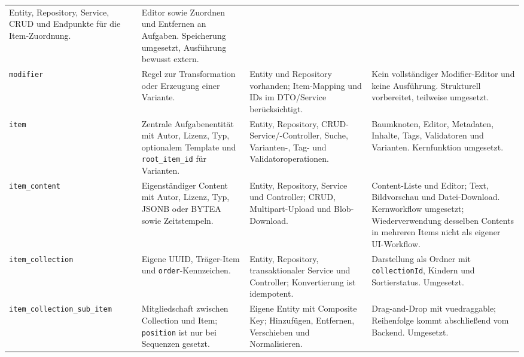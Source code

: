 \documentclass[11pt,a4paper]{article}
\begin{document}
\begin{longtable}{|p{.13\linewidth}|p{.24\linewidth}|p{.28\linewidth}|p{.24\linewidth}|}
Entity, Repository, Service, CRUD und Endpunkte für die Item-Zuordnung.&
Editor sowie Zuordnen und Entfernen an Aufgaben. Speicherung umgesetzt,
Ausführung bewusst extern.\\
\texttt{modifier}&Regel zur Transformation oder Erzeugung einer Variante.&
Entity und Repository vorhanden; Item-Mapping und IDs im DTO/Service
berücksichtigt.&Kein vollständiger Modifier-Editor und keine Ausführung.
Strukturell vorbereitet, teilweise umgesetzt.\\
\texttt{item}&Zentrale Aufgabenentität mit Autor, Lizenz, Typ, optionalem
Template und \texttt{root\_item\_id} für Varianten.&Entity, Repository,
CRUD-Service/-Controller, Suche, Varianten-, Tag- und Validatoroperationen.&
Baumknoten, Editor, Metadaten, Inhalte, Tags, Validatoren und Varianten.
Kernfunktion umgesetzt.\\
\texttt{item\_\allowbreak content}&Eigenständiger Content mit Autor, Lizenz, Typ, JSONB
oder BYTEA sowie Zeitstempeln.&Entity, Repository, Service und Controller;
CRUD, Multipart-Upload und Blob-Download.&Content-Liste und Editor; Text,
Bildvorschau und Datei-Download. Kernworkflow umgesetzt; Wiederverwendung
desselben Contents in mehreren Items nicht als eigener UI-Workflow.\\
\texttt{item\_\allowbreak collection}&Eigene UUID, Träger-Item und
\texttt{order}-Kennzeichen.&Entity, Repository, transaktionaler Service und
Controller; Konvertierung ist idempotent.&Darstellung als Ordner mit
\texttt{collectionId}, Kindern und Sortierstatus. Umgesetzt.\\
\texttt{item\_\allowbreak collection\_\allowbreak sub\_\allowbreak item}&Mitgliedschaft zwischen Collection und
Item; \texttt{position} ist nur bei Sequenzen gesetzt.&Eigene Entity mit
Composite Key; Hinzufügen, Entfernen, Verschieben und Normalisieren.&
Drag-and-Drop mit vuedraggable; Reihenfolge kommt abschließend vom Backend.
Umgesetzt.\\
\hline
\end{longtable}
\normalsize
\end{document}
